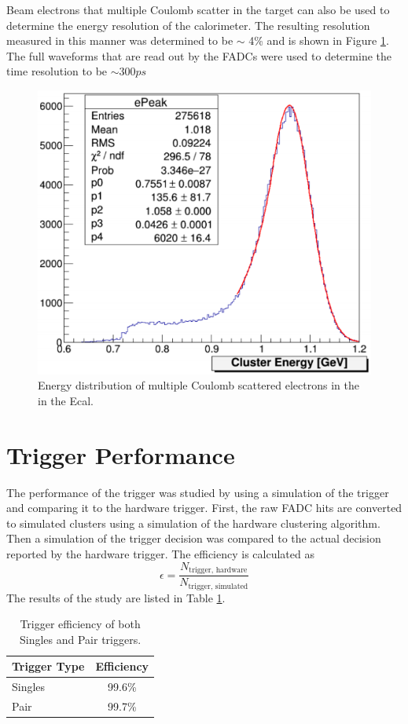 Beam electrons that multiple Coulomb scatter in the target can also be used to 
determine the energy resolution of the calorimeter.  The resulting resolution 
measured in this manner was determined to be $\sim$ 4\% and is shown in Figure
\ref{fig:energy_res}.  The full waveforms that are read out by the FADCs were 
used to determine the time resolution to be $\sim 300 ps$
\begin{figure}[h!t]
    \centering
    \includegraphics[width=.7\textwidth]{images/ecal_energy_resolution.png}
    \caption{Energy distribution of multiple Coulomb scattered electrons in the
             in the Ecal.}
    \label{fig:energy_res}
\end{figure} 

\section{Trigger Performance}

The performance of the trigger was studied by using a simulation of the trigger
and comparing it to the hardware trigger.  First, the raw FADC hits are converted
to simulated clusters using a simulation of the hardware clustering algorithm. Then
a simulation of the trigger decision was compared to the actual decision reported
by the hardware trigger.  The efficiency is calculated as 
\begin{equation}
\epsilon = \frac{N_{\text{trigger, hardware}}}{N_{\text{trigger, simulated}}}
\end{equation}
The results of the study are listed in Table 
\ref{tab:trig_eff}.
\begin{table}[h!]
    \centering
    \begin{tabular}{lc}
        \toprule
        \textbf{Trigger Type} & \textbf{Efficiency} \\
        \midrule
        \midrule
        Singles               & 99.6\%              \\
        Pair                  & 99.7\%              \\
        \bottomrule
    \end{tabular}
    \caption{Trigger efficiency of both Singles and Pair triggers.}
    \label{tab:trig_eff}
\end{table}



